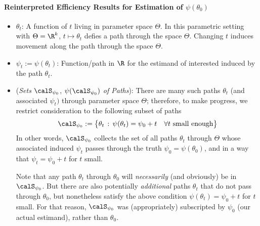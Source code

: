 \documentclass[12pt]{article}
\theoremstyle{plain}
\theoremstyle{definition}
\theoremstyle{remark}
\begin{document}
\paragraph{Reinterpreted Efficiency Results for Estimation of $\psi(\theta_0)$}
\begin{itemize}
  \item $\theta_t$:
    A function of $t$ living in parameter space $\Theta$.
    In this parametric setting with $\Theta=\R^k$,
    $t\mapsto \theta_t$ defies a path through the space $\Theta$.
    Changing $t$ induces movement along the path through the space
    $\Theta$.

  \item $\psi_t:=\psi(\theta_t)$:
    Function/path in $\R$ for the estimand of interested induced by the
    path $\theta_t$.

  \item
    (\emph{Sets} $\calS_{\psi_0}$, $\psi(\calS_{\psi_0})$ \emph{of Paths}):
    There are many such paths $\theta_t$ (and associated $\psi_t)$
    through parameter space $\Theta$;
    therefore, to make progress, we restrict consideration to the
    following subset of paths
    \begin{align*}
      \calS_{\psi_0}
      :=
      \big\{
        \theta_t
        \,:\,
        \psi(\theta_t) = \psi_0 + t
        \quad
        \forall \text{$t$ small enough}
      \big\}
    \end{align*}
    In other words, $\calS_{\psi_0}$ collects the set of all paths
    $\theta_t$ through $\Theta$ whose associated induced $\psi_t$ passes
    through the truth $\psi_0=\psi(\theta_0)$, and in a way that
    $\psi_t=\psi_0+t$ for $t$ small.

    Note that any path $\theta_t$ through $\theta_0$ will
    \emph{necessarily} (and obviously) be in $\calS_{\psi_0}$.
    But there are also potentially \emph{additional} paths $\theta_t$
    that do not pass through $\theta_0$, but nonetheless satisfy the
    above condition $\psi(\theta_t)=\psi_0+t$ for $t$ small.
    For that reason, $\calS_{\psi_0}$ was (appropriately) subscripted
    by $\psi_0$ (our actual estimand), rather than $\theta_0$.


\end{itemize}
\end{document}
